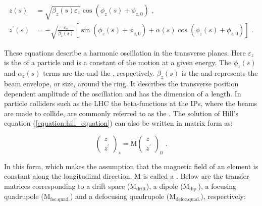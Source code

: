 \begin{equation}
    \begin{aligned}
        z(s)          &= \sqrt{\beta_{z}(s) \varepsilon_{z}} \cos \left( \phi_{z}(s) + \phi_{z,0} \right) \text{ ,} \\
        z^{\prime}(s) &= -\sqrt{\frac{\varepsilon_z}{\beta_z(s)}} \left[ \sin \left(\phi_z(s) + \phi_{z, 0} \right) + \alpha(s) \cos \left( \phi_z(s) + \phi_{z, 0} \right) \right] \text{ .}
    \end{aligned}
    \label{equation:hill_solution}
\end{equation}
\vspace{0.5mm}

These equations describe a harmonic oscillation in the transverse planes.
Here \(\varepsilon_z\) is the  of a particle and is a constant of the motion at a given energy. 
The \(\phi_z(s)\) and \(\alpha_z(s)\) terms are the  and the , respectively.
\(\beta_z(s)\) is the  and represents the beam envelope, or size, around the ring.
It describes the transverse position dependent amplitude of the oscillation and has the dimension of a length.
In particle colliders such as the \gls{LHC} the \glspl{beta-function} at the \glspl{IP}, where the beams are made to collide, are commonly referred to as the .
The solution of Hill's equation (\cref{equation:hill_equation}) can also be written in matrix form as:

\begin{equation}
    \begin{pmatrix}
        z \\
        z^{\prime}
    \end{pmatrix}_{s}
    = \mathrm{M}
    \begin{pmatrix}
        z \\
        z^{\prime}
    \end{pmatrix}_{0} \text{ .}
    \label{equation:hill_solution_matrix}
\end{equation}
\vspace{0.5mm}

In this form, which makes the assumption that the magnetic field of an element is constant along the longitudinal direction, M is called a . 
Below are the transfer matrices corresponding to a drift space (\(\mathrm{M_{drift}}\)), a dipole (\(\mathrm{M_{dip.}}\)), a focusing quadrupole (\(\mathrm{M_{foc. quad.}}\)) and a defocusing quadrupole (\(\mathrm{M_{defoc. quad.}}\)), respectively:

